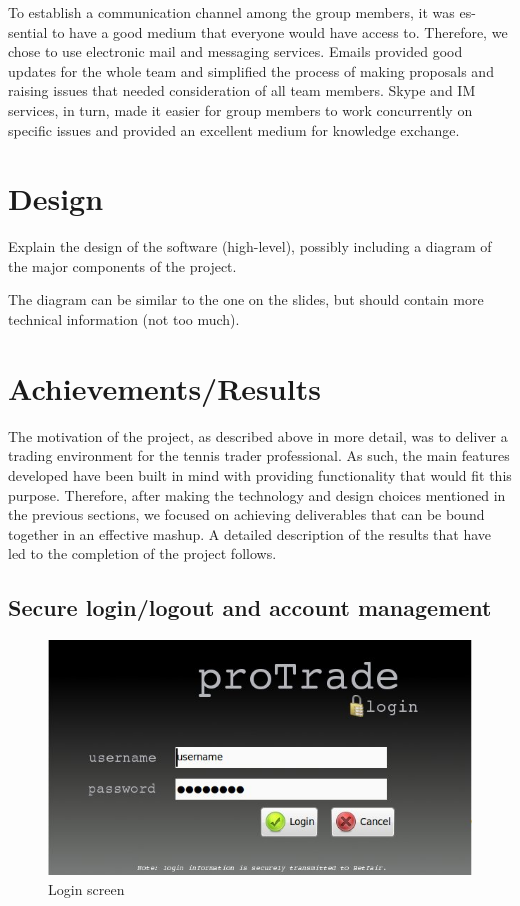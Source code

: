 \documentclass[10pt]{report}
\begin{document}
To establish a communication channel among the group members, it was es-
sential to have a good medium that everyone would have access to. Therefore,
we chose to use electronic mail and messaging services. Emails provided good
updates for the whole team and simplified the process of making proposals and
raising issues that needed consideration of all team members. Skype and IM
services, in turn, made it easier for group members to work concurrently on
specific issues and provided an excellent medium for knowledge exchange.

\section{Design}
Explain the design of the software (high-level), possibly including a diagram of the major components of the project.

The diagram can be similar to the one on the slides, but should contain more technical information (not too much).

\section{Achievements/Results}

The motivation of the project, as described above in more detail, was to deliver a trading environment for the tennis trader professional. As such, the main features developed have been built in mind with providing functionality that would fit this purpose. Therefore, after making the technology and design choices mentioned in the previous sections, we focused on achieving deliverables that can be bound together in an effective mashup. A detailed description of the results that have led to the completion of the project follows.

\subsection {Secure login/logout and account management}
\begin{figure}[ht]
\centering
\includegraphics[bb=0 0 650 350, scale = 0.3]{features-screenshots/login.jpg}
\caption{Login screen}
\end{figure}
\end{document}
